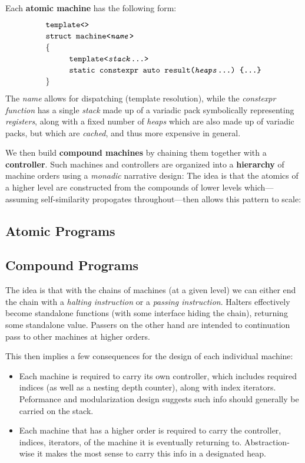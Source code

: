 \documentclass[twoside]{article}
\newcommand{\strong}[1]{{\bfseries #1}}
\newcommand{\tab}[1][1.125cm]{\hspace{#1}}
\begin{document}
\noindent Each \strong{atomic machine} has the following form:
$$ \def\arraystretch{1.15}
\tab[0cm] \begin{array}{l}
\texttt{template<>}									\\
\texttt{struct machine<\emph{name}>}							\\
\{											\\
\tab[1cm]\texttt{template<\emph{stack}\ldots>}						\\
\tab[1cm]\texttt{static constexpr auto result(\emph{heaps}\ldots)\ \{\ldots\}}		\\
\}
\end{array} $$
The \emph{name} allows for dispatching (template resolution), while the \emph{constexpr function}
has a single \emph{stack} made up of a variadic pack symbolically representing \emph{registers},
along with a fixed number of \emph{heaps} which are also made up of variadic packs, but which
are \emph{cached}, and thus more expensive in general.

We then build \strong{compound machines} by chaining them together with a \strong{controller}.
Such machines and controllers are organized into a \strong{hierarchy} of machine orders using
a \emph{monadic} narrative design: The idea is that the atomics of a higher level are constructed
from the compounds of lower levels which---assuming self-similarity propogates throughout---then
allows this pattern to scale:

\subsection*{Atomic Programs}

\subsection*{Compound Programs}

The idea is that with the chains of machines (at a given level) we can either end the chain with
a \emph{halting instruction} or a \emph{passing instruction}. Halters effectively become standalone functions
(with some interface hiding the chain), returning some standalone value. Passers on the other hand are intended
to continuation pass to other machines at higher orders.

This then implies a few consequences for the design of each individual machine:

\begin{itemize}
\item Each machine is required to carry its own controller, which includes required indices (as well as a nesting
depth counter), along with index iterators. Peformance and modularization design suggests such info should generally
be carried on the stack.
\item Each machine that has a higher order is required to carry the controller, indices, iterators, of the machine
it is eventually returning to. Abstraction-wise it makes the most sense to carry this info in a designated heap.
\end{itemize}
\end{document}
